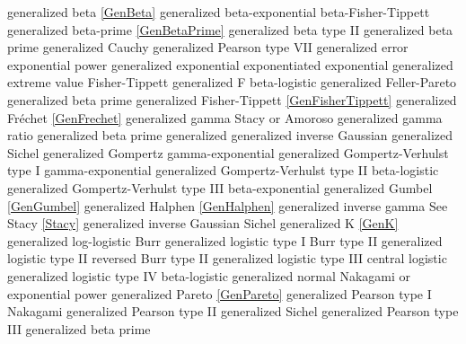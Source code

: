 generalized beta 				\dotfill	\eqref{GenBeta} 					\ncite	%
generalized beta-exponential	\dotfill	beta-Fisher-Tippett					\ncite
generalized beta-prime 			\dotfill	\eqref{GenBetaPrime} 				 %
generalized beta type II		\dotfill	generalized beta prime				
generalized Cauchy				\dotfill	generalized Pearson type VII		\ncite
generalized error				\dotfill	exponential power					\ncite
generalized exponential			\dotfill	exponentiated exponential 			    %
generalized extreme value		\dotfill	Fisher-Tippett						\ncite	%
generalized F					\dotfill	beta-logistic 						\ncite	%
generalized Feller-Pareto		\dotfill	generalized beta prime				
generalized Fisher-Tippett		\dotfill	\eqref{GenFisherTippett} 			\ncite	%
generalized Fr\'{e}chet 		\dotfill	\eqref{GenFrechet} 					\ncite	%
generalized gamma 				\dotfill	Stacy or Amoroso 					\ncite	%
generalized gamma ratio			\dotfill	generalized beta prime				 	%
generalized generalized inverse Gaussian	\dotfill	generalized Sichel		
generalized Gompertz			\dotfill	gamma-exponential					
generalized Gompertz-Verhulst type I \dotfill	gamma-exponential				    	%
generalized Gompertz-Verhulst type II \dotfill	beta-logistic  					    	%
generalized Gompertz-Verhulst type III \dotfill	beta-exponential 				   		%
generalized Gumbel				\dotfill	\eqref{GenGumbel}					\ncite	%
generalized Halphen				\dotfill	\eqref{GenHalphen}					\ncite
generalized inverse gamma 		\dotfill	See Stacy \eqref{Stacy} 			\ncite	%
generalized inverse Gaussian	\dotfill	Sichel								\ncite
generalized K					\dotfill	\eqref{GenK}						\mcite{\self} 
generalized log-logistic		\dotfill	Burr 								\ncite	%
generalized logistic type I		\dotfill	Burr type II 						\ncite	%
generalized logistic type II	\dotfill	reversed Burr type II 				\ncite	%
generalized logistic type III	\dotfill	central logistic 					\ncite	%
generalized logistic type IV	\dotfill	beta-logistic 						   		%
generalized normal	 			\dotfill	Nakagami or exponential power		\ncite	%
generalized Pareto				\dotfill	\eqref{GenPareto}					\ncite	%
generalized Pearson type I		\dotfill	Nakagami							
generalized Pearson type II		\dotfill	generalized Sichel					
generalized Pearson type III	\dotfill	generalized beta prime				
